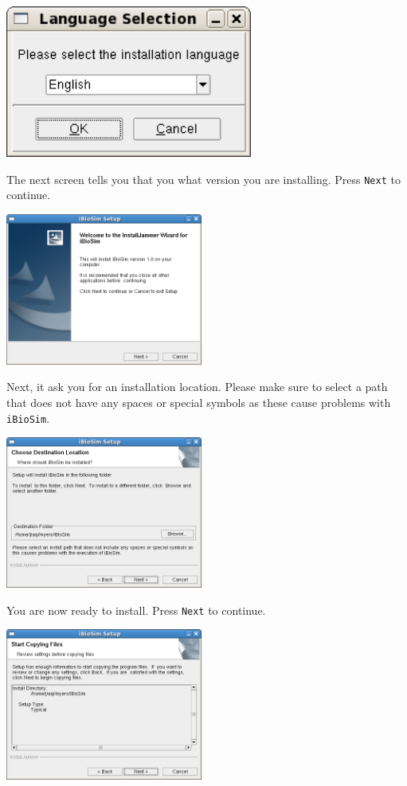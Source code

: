 \documentclass[titlepage,11pt]{article}
\begin{document}
\includegraphics[height=50mm]{screenshots/language}

The next screen tells you that you what version you are installing.
Press {\tt Next} to continue.

\includegraphics[height=50mm]{screenshots/setup}

Next, it ask you for an installation location.  Please make sure to
select a path that does not have any spaces or special symbols as
these cause problems with {\tt iBioSim}.

\includegraphics[height=50mm]{screenshots/location}

You are now ready to install.  Press {\tt Next} to continue.

\includegraphics[height=50mm]{screenshots/confirm}
\end{document}
